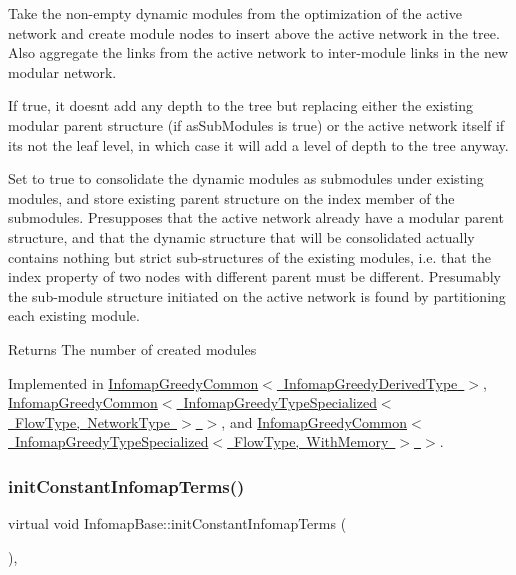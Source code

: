 Take the non-\/empty dynamic modules from the optimization of the active network and create module nodes to insert above the active network in the tree. Also aggregate the links from the active network to inter-\/module links in the new modular network.

If true, it doesn\textquotesingle{}t add any depth to the tree but replacing either the existing modular parent structure (if {\ttfamily as\+Sub\+Modules} is true) or the active network itself if it\textquotesingle{}s not the leaf level, in which case it will add a level of depth to the tree anyway.

Set to true to consolidate the dynamic modules as submodules under existing modules, and store existing parent structure on the index member of the submodules. Presupposes that the active network already have a modular parent structure, and that the dynamic structure that will be consolidated actually contains nothing but strict sub-\/structures of the existing modules, i.\+e. that the index property of two nodes with different parent must be different. Presumably the sub-\/module structure initiated on the active network is found by partitioning each existing module.

\begin{DoxyReturn}{Returns}
The number of created modules 
\end{DoxyReturn}


Implemented in \mbox{\hyperlink{classInfomapGreedyCommon_ad4845dbd57d006f5220e6a7d9f293f9d}{Infomap\+Greedy\+Common$<$ Infomap\+Greedy\+Derived\+Type $>$}}, \mbox{\hyperlink{classInfomapGreedyCommon_ad4845dbd57d006f5220e6a7d9f293f9d}{Infomap\+Greedy\+Common$<$ Infomap\+Greedy\+Type\+Specialized$<$ Flow\+Type, Network\+Type $>$ $>$}}, and \mbox{\hyperlink{classInfomapGreedyCommon_ad4845dbd57d006f5220e6a7d9f293f9d}{Infomap\+Greedy\+Common$<$ Infomap\+Greedy\+Type\+Specialized$<$ Flow\+Type, With\+Memory $>$ $>$}}.

\mbox{\label{classInfomapBase_a093ad5e840cb4529ac32eaf4f9d6d8b2}} 
\subsubsection{\texorpdfstring{init\+Constant\+Infomap\+Terms()}{initConstantInfomapTerms()}}
{\footnotesize\ttfamily virtual void Infomap\+Base\+::init\+Constant\+Infomap\+Terms (\begin{DoxyParamCaption}{ }\end{DoxyParamCaption})\hspace{0.3cm}{\ttfamily [protected]}, {}}


